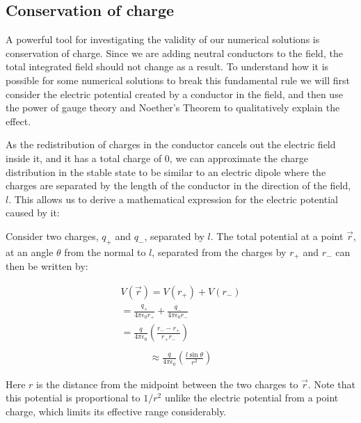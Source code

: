 \documentclass[aps,twocolumn,pre,nofootinbib,10pt]{revtex4-1}
\begin{document}
\subsection{Conservation of charge}

A powerful tool for investigating the validity of our numerical solutions is conservation of charge. Since we are adding neutral conductors to the field, the total integrated field should not change as a result. To understand how it is possible for some numerical solutions to break this fundamental rule we will first consider the electric potential created by a conductor in the field, and then use the power of gauge theory and Noether's Theorem to qualitatively explain the effect.

As the redistribution of charges in the conductor cancels out the electric field inside it, and it has a total charge of 0, we can approximate the charge distribution in the stable state to be similar to an electric dipole where the charges are separated by the length of the conductor in the direction of the field, $l$. This allows us to derive a mathematical expression for the electric potential caused by it:

Consider two charges, $q_+$ and $q_-$, separated by $l$. The total potential at a point $\vec{r}$, at an angle $\theta$ from the normal to $l$, separated from the charges by $r_+$ and $r_-$ can then be written by:

\begin{gather*}
V(\vec{r}) = V(r_+) + V(r_-) \\
 = \frac{q_+}{4 \pi \epsilon_0 r_+} + \frac{q_-}{4 \pi \epsilon_0 r_-} \\
 = \frac{q}{4 \pi \epsilon_0}\left( \frac{r_- - r_+}{r_+ r_-} \right) \\
\end{gather*}
\begin{gather}
 \approx \frac{q}{4 \pi \epsilon_0} \left( \frac{l \sin\theta}{r^2} \right) 
 \label{dipole}
\end{gather}



Here $r$ is the distance from the midpoint between the two charges to $\vec{r}$. Note that this potential is proportional to $1/r^2$ unlike the electric potential from a point charge, which limits its effective range considerably.
\end{document}

